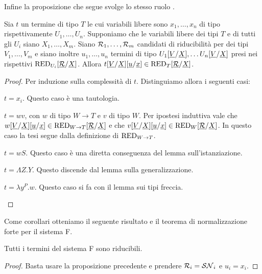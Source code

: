 \documentclass[]{marticle}
\begin{document}
Infine la proposizione che segue svolge lo stesso ruolo .
\begin{block} [Proposizione]
    Sia $t$ un termine di tipo $T$ le cui variabili libere sono $x_1, \dots,
    x_n$ di tipo rispettivamente $U_1, \dots, U_n$. Supponiamo che le variabili
    libere dei tipi $T$ e di tutti gli $U_i$ siano $X_1, \dots, X_m$. Siano
    $\mathcal{R}_1, \dots, \mathcal{R}_m$ candidati di riducibilit\`a per dei tipi $V_1,
    \dots, V_m$ e siano inoltre $u_1, \dots, u_n$ termini di tipo
    $U_1[\underline{V}/\underline{X}], \dots
    U_n[\underline{V}/\underline{X}]$ presi nei rispettivi
    $\text{RED}_{U_i}[\underline{\mathcal{R}}/\underline{X}]$. Allora $t[\underline{V}/\underline{X}]
    [\underline{u}/\underline{x}] \in \text{RED}_{T}[\underline{\mathcal{R}}/\underline{X}]$.
\newcommand{\subvx}{\sub{\underline{V}}{\underline{X}}}
\newcommand{\subut}{\sub{\underline{u}}{\underline{x}}}
\begin{proof}
    Per induzione sulla complessit\`a di $t$. Distinguiamo allora i seguenti
    casi:
    \begin{nlist}[i]
        \item $t=x_i$. Questo caso \`e una tautologia.
        \item $t=wv$, con $w$ di tipo $W\rightarrow T$ e $v$ di tipo $W$. Per
            ipostesi induttiva vale che $w\subvx\subut\in \red{W \rightarrow
            T}\subrx$ e che $v\subvx\subut \in \red{W}\subrx$. In questo caso la
            tesi segue dalla definizione di $\text{RED}_{W\rightarrow T}$.
        \item $t=wS$. Questo caso \`e una diretta conseguenza del lemma 
            sull'istanziazione. 
        \item $t=\Lambda Z. Y$. Questo discende dal lemma  sulla
            generalizzazione.
        \item $t=\lambda y^P.w$. Questo caso si fa con il lemma  sui tipi
            freccia.
    \end{nlist}
\end{proof}
\end{block}

Come corollari otteniamo il seguente risultato e il teorema di normalizzazione
forte per il sistema F.

\begin{block} [Proposizione]
    Tutti i termini del sistema F sono riducibili.
\begin{proof}
    Basta usare la proposizione precedente e prendere $\mathcal{R}_i=\mathcal{SN}_i$ e
    $u_i=x_i$.
\end{proof}
\end{block}
\end{document}
